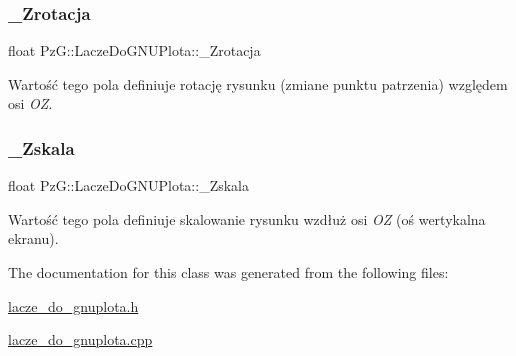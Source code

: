 \subsubsection{\texorpdfstring{\+\_\+\+Zrotacja}{\_Zrotacja}}
{\footnotesize\ttfamily float Pz\+G\+::\+Lacze\+Do\+G\+N\+U\+Plota\+::\+\_\+\+Zrotacja\hspace{0.3cm}{\ttfamily [protected]}}

Wartość tego pola definiuje rotację rysunku (zmiane punktu patrzenia) względem osi {\itshape OZ}. \mbox{\label{classPzG_1_1LaczeDoGNUPlota_a85446d06b2d714b2f852ef43c47c73c1}} 
\subsubsection{\texorpdfstring{\+\_\+\+Zskala}{\_Zskala}}
{\footnotesize\ttfamily float Pz\+G\+::\+Lacze\+Do\+G\+N\+U\+Plota\+::\+\_\+\+Zskala\hspace{0.3cm}{\ttfamily [protected]}}

Wartość tego pola definiuje skalowanie rysunku wzdłuż osi {\itshape OZ} (oś wertykalna ekranu). 

The documentation for this class was generated from the following files\+:\begin{DoxyCompactItemize}
\item 
\hyperlink{lacze__do__gnuplota_8h}{lacze\+\_\+do\+\_\+gnuplota.\+h}\item 
\hyperlink{lacze__do__gnuplota_8cpp}{lacze\+\_\+do\+\_\+gnuplota.\+cpp}\end{DoxyCompactItemize}

